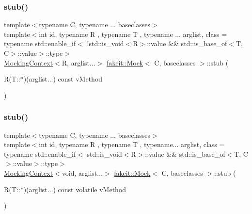\mbox{\label{classfakeit_1_1Mock_a7a8f38b58b068b35f263eee42d75c162}} 
\subsubsection{\texorpdfstring{stub()}{stub()}\hspace{0.1cm}{\footnotesize\ttfamily [49/72]}}
{\footnotesize\ttfamily template$<$typename C, typename ... baseclasses$>$ \\
template$<$int id, typename R , typename T , typename ... arglist, class  = typename std\+::enable\+\_\+if$<$                !std\+::is\+\_\+void$<$\+R$>$\+::value \&\& std\+::is\+\_\+base\+\_\+of$<$\+T, C$>$\+::value$>$\+::type$>$ \\
\mbox{\hyperlink{classfakeit_1_1MockingContext}{Mocking\+Context}}$<$R, arglist...$>$ \mbox{\hyperlink{classfakeit_1_1Mock}{fakeit\+::\+Mock}}$<$ C, baseclasses $>$\+::stub (\begin{DoxyParamCaption}\item[{R(T\+::$\ast$)(arglist...) const}]{v\+Method }\end{DoxyParamCaption})\hspace{0.3cm}{\ttfamily [inline]}}

\mbox{\label{classfakeit_1_1Mock_a22b83b574e4db2689c8a1f3375554035}} 
\subsubsection{\texorpdfstring{stub()}{stub()}\hspace{0.1cm}{\footnotesize\ttfamily [50/72]}}
{\footnotesize\ttfamily template$<$typename C, typename ... baseclasses$>$ \\
template$<$int id, typename R , typename T , typename... arglist, class  = typename std\+::enable\+\_\+if$<$                std\+::is\+\_\+void$<$\+R$>$\+::value \&\& std\+::is\+\_\+base\+\_\+of$<$\+T, C$>$\+::value$>$\+::type$>$ \\
\mbox{\hyperlink{classfakeit_1_1MockingContext}{Mocking\+Context}}$<$void, arglist...$>$ \mbox{\hyperlink{classfakeit_1_1Mock}{fakeit\+::\+Mock}}$<$ C, baseclasses $>$\+::stub (\begin{DoxyParamCaption}\item[{R(T\+::$\ast$)(arglist...) const volatile}]{v\+Method }\end{DoxyParamCaption})\hspace{0.3cm}{\ttfamily [inline]}}

